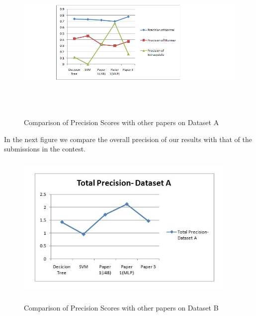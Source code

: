 \documentclass{article}
\begin{document}
\begin{enumerate}
\begin{figure}
\begin{center}
\includegraphics[width= 450pt, height=200pt]{datasetb.png}\\
\caption{Comparison of Precision Scores with other papers on Dataset A}
\end{center}
\end{figure}

In the next figure we compare the overall precision of our results with that of the submissions in the contest.\\

\begin{figure}
\begin{center}
\includegraphics[width=300pt, height=200pt]{TotalPrecicionDatasetA(Challenge2).jpg}\\
\caption{Comparison of Precision Scores with other papers on Dataset B}
\end{center}
\end{figure}



\end{enumerate}
\end{document}
